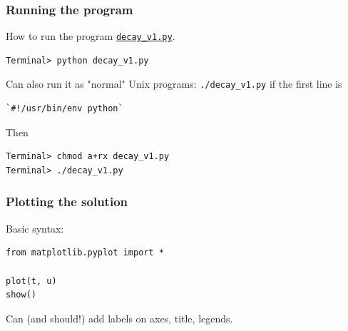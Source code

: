 \documentclass{beamer}
\begin{document}
\begin{frame}
\frametitle{Running the program}

How to run the program \href{{http://tinyurl.com/ofkw6kc/alg/decay_v1.py}}{\nolinkurl{decay_v1.py}}.

\begin{verbatim}
Terminal> python decay_v1.py
\end{verbatim}

Can also run it as "normal" Unix programs: \Verb!./decay_v1.py! if the
first line is

\begin{verbatim}
`#!/usr/bin/env python`
\end{verbatim}

Then
\begin{verbatim}
Terminal> chmod a+rx decay_v1.py
Terminal> ./decay_v1.py
\end{verbatim}
\end{frame}

\begin{frame}
\frametitle{Plotting the solution}

Basic syntax:

\begin{verbatim}
from matplotlib.pyplot import *

plot(t, u)
show()
\end{verbatim}

Can (and should!) add labels on axes, title, legends.
\end{frame}
\end{document}
